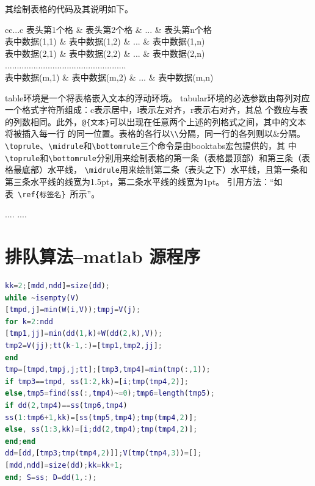 \documentclass{cumcmthesis}
\begin{document}
其绘制表格的代码及其说明如下。
\begin{tcode}
\begin{table}[!htbp]
\caption[标签名]{中文标题}
\begin{tabular}{cc...c}
\toprule[1.5pt]
表头第1个格   & 表头第2个格   & ... & 表头第n个格  \\
\midrule[1pt]
表中数据(1,1) & 表中数据(1,2) & ... & 表中数据(1,n)\\
表中数据(2,1) & 表中数据(2,2) & ... & 表中数据(2,n)\\
...................................................\\
表中数据(m,1) & 表中数据(m,2) & ... & 表中数据(m,n)\\
\bottomrule[1.5pt]
\end{tabular}
\end{table}
\end{tcode}

\bigskip
table环境是一个将表格嵌入文本的浮动环境。
tabular环境的必选参数由每列对应一个格式字符所组成：c表示居中，l表示左对齐，r表示右对齐，其总
个数应与表的列数相同。此外，\verb|@{文本}|可以出现在任意两个上述的列格式之间，其中的文本将被插入每一行
的同一位置。表格的各行以\verb|\\|分隔，同一行的各列则以\&分隔。
\verb|\toprule|、\verb|\midrule|和\verb|\bottomrule|三个命令是由booktabs宏包提供的，其
中\verb|\toprule|和\verb|\bottomrule|分别用来绘制表格的第一条（表格最顶部）和第三条（表格最底部）水平线，
\verb|\midrule|用来绘制第二条（表头之下）水平线，且第一条和第三条水平线的线宽为1.5pt，第二条水平线的线宽为1pt。
引用方法：“如表~\verb|\ref{标签名}|~所示”。


\begin{thebibliography}{9}%
  ....
  ....
\end{thebibliography}

\newpage
\appendix
\section{排队算法--matlab 源程序}
\begin{lstlisting}[language=matlab]
kk=2;[mdd,ndd]=size(dd);
while ~isempty(V)
[tmpd,j]=min(W(i,V));tmpj=V(j);
for k=2:ndd
[tmp1,jj]=min(dd(1,k)+W(dd(2,k),V));
tmp2=V(jj);tt(k-1,:)=[tmp1,tmp2,jj];
end
tmp=[tmpd,tmpj,j;tt];[tmp3,tmp4]=min(tmp(:,1));
if tmp3==tmpd, ss(1:2,kk)=[i;tmp(tmp4,2)];
else,tmp5=find(ss(:,tmp4)~=0);tmp6=length(tmp5);
if dd(2,tmp4)==ss(tmp6,tmp4)
ss(1:tmp6+1,kk)=[ss(tmp5,tmp4);tmp(tmp4,2)];
else, ss(1:3,kk)=[i;dd(2,tmp4);tmp(tmp4,2)];
end;end
dd=[dd,[tmp3;tmp(tmp4,2)]];V(tmp(tmp4,3))=[];
[mdd,ndd]=size(dd);kk=kk+1;
end; S=ss; D=dd(1,:);
 \end{lstlisting}
\end{document}
